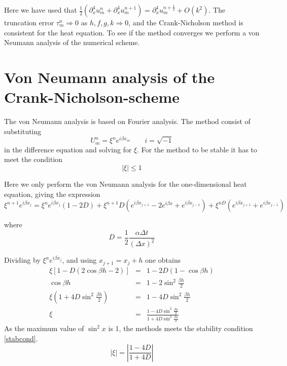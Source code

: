 Here we have used that $\frac{1}{2}(\partial_x^4 u_m^n + \partial_x^4 u_m^{n+1}) = \partial_x^4 u_m^{n+\frac{1}{2}} + O(k^2)$. 
The truncation error $\tau_m^n \Rightarrow 0$ as $h,f,g,k \Rightarrow 0$, and the Crank-Nicholson method is consistent for the heat equation. To see if the method converges we perform a von Neumann analysis of the numerical scheme.

\section{Von Neumann analysis of the Crank-Nicholson-scheme}

The von Neumann analysis is based on Fourier analysis. The method consist of substituting 
\begin{equation*}
	U_m^n=\xi^n e^{i \beta x_m} \quad \quad  i=\sqrt{-1}
\end{equation*}
in the difference equation and solving for $\xi$.
For the method to be stable it has to meet the condition
\begin{equation}
	\mid{\xi}\mid \leq 1
	\label{stabcond}
\end{equation}

Here we only perform the von Neumann analysis for the one-dimensional heat
equation, giving the expression
\begin{equation*}
\xi^{n+1} e^{i\beta x_{j}} = \xi^{n} e^{i\beta x_j}\left(1-2D\right) + \xi^{n+1}D\left(e^{i\beta x_{j+1}} - 2e^{i\beta  x} + e^{i\beta x_{j-1}}\right) + \xi^{nD}\left(e^{i\beta x_{j+1}} + e^{i\beta x_{j-1}}\right)
\end{equation*}

where
\begin{equation*}
D = \frac{1}{2}\frac{\alpha\Delta t}{(\Delta x)^2}
\label{eq:crank-D}
\end{equation*}

Dividing  by $\xi^ne^{i\beta x_j}$, and using $x_{j+1} = x_j + h$ one obtains    %
\begin{eqnarray*}
\xi\left[1-D\left(2\cos{\beta h} - 2\right)\right] &=& 1 - 2D\left(1-\cos{\beta h}\right) \\
\cos{\beta h} &=& 1-2\sin^2{\frac{\beta h}{2}} \\
\xi\left(1+4D\sin^{2}{\frac{\beta h}{2}}\right) &=& 1 - 4D\sin^2{\frac{\beta h}{2}} \\
\xi &=& \frac{1-4D\sin^2{\frac{\beta h}{2}}}{1+4D\sin^2{\frac{\beta h}{2}}}
\end{eqnarray*}
As the maximum value of $\sin^2{x}$ is 1, the methods meets the stability condition \ref{stabcond}.
\begin{equation}
|\xi | = \left|\frac{1-4D}{1+4D}\right|
\end{equation}

